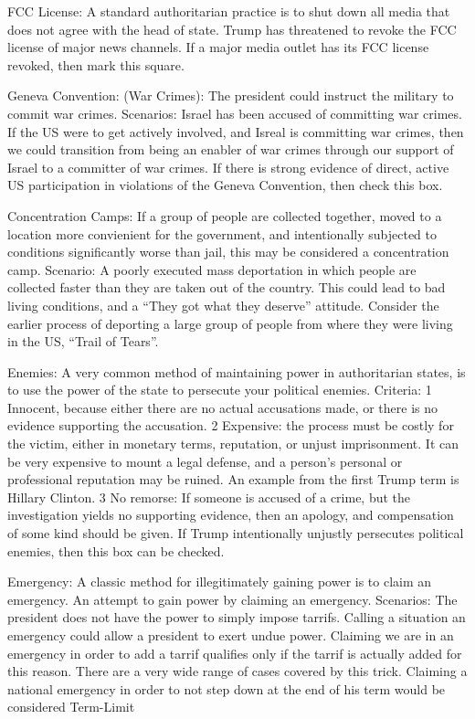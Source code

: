 \documentclass{article}
\begin{document}
FCC License: A standard authoritarian practice is to shut down all media that does not agree with the
head of state.  Trump has threatened to revoke the FCC license of major news channels.
If a major media outlet has its FCC license revoked, then mark this square.


Geneva Convention: (War Crimes): The president could instruct the military to commit war crimes.
Scenarios:  Israel has been accused of committing war crimes.  If the
US were to get actively involved, and Isreal is committing war crimes, then we could
transition from being an enabler of war crimes through our support of Israel to a
committer of war crimes.  If there is strong evidence of direct, active US participation
in violations of the Geneva Convention, then check this box.

Concentration Camps:  If a group of people are collected together, moved to a location
more convienient for the government, and intentionally subjected
to conditions significantly worse than jail, this may be considered
a concentration camp.
Scenario:  A poorly executed mass deportation in which people are collected
faster than they are taken out of the country.  This could lead to bad living conditions,
and a ``They got what they deserve'' attitude.  Consider the earlier process
of deporting a large group of people from where they were living in the US,
``Trail of Tears''.

Enemies: A very common method of maintaining power in authoritarian states, is to use the power
of the state to persecute your political enemies.
Criteria: 1 Innocent, because either there are no
actual accusations made, or there is no evidence supporting the accusation.
2  Expensive: the process must be costly for the victim, either in monetary terms,
reputation, or unjust imprisonment.  It can be very expensive
to mount a legal defense, and a person's personal or professional reputation may be ruined.
An example from the first Trump term is Hillary Clinton.
3  No remorse:  If someone is accused of a crime, but the investigation yields no supporting
evidence, then an apology, and compensation of some kind should be given.
If Trump intentionally unjustly persecutes political enemies, then this box can be checked.

Emergency: A classic method for illegitimately gaining power is to claim an emergency.
An attempt to gain power by claiming an emergency.
Scenarios: The president does not have the power to simply impose tarrifs.
Calling a situation an emergency could allow a president to exert undue power.
Claiming we are in an emergency in order to add a tarrif qualifies only if the tarrif is
actually added
for this reason.  There are a very wide range of cases covered by this trick.
Claiming a national emergency in order to not step down at the end of his term
would be considered Term-Limit
\end{document}
